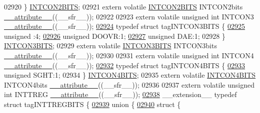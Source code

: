 \begin{DoxyCode}
02920 \} \hyperlink{a00008_d8/d57/a00498}{INTCON2BITS};
02921 \textcolor{keyword}{extern} \textcolor{keyword}{volatile} \hyperlink{a00008_d8/d57/a00498}{INTCON2BITS} INTCON2bits \hyperlink{a00009_a493c46f03454991ccc5aa7a6e1dfb2a7}{\_\_attribute\_\_}((\_\_sfr\_\_));
02922 
02923 \textcolor{keyword}{extern} \textcolor{keyword}{volatile} \textcolor{keywordtype}{unsigned} \textcolor{keywordtype}{int}  INTCON3 \hyperlink{a00009_a493c46f03454991ccc5aa7a6e1dfb2a7}{\_\_attribute\_\_}((\_\_sfr\_\_));
\hypertarget{a00009_source_l02924}{}\hyperlink{a00008}{02924} \textcolor{keyword}{typedef} \textcolor{keyword}{struct }tagINTCON3BITS \{
\hypertarget{a00009_source_l02925}{}\hyperlink{a00008_adf71f3d8410c1f1dbbc96680a92c49af}{02925}   \textcolor{keywordtype}{unsigned} :4;
\hypertarget{a00009_source_l02926}{}\hyperlink{a00008_ac08ea92557a6100bdfa6e0c8e1842273}{02926}   \textcolor{keywordtype}{unsigned} DOOVR:1;
\hypertarget{a00009_source_l02927}{}\hyperlink{a00008_aec1162551ca60d4d19c47e42894a1c1b}{02927}   \textcolor{keywordtype}{unsigned} DAE:1;
02928 \} \hyperlink{a00008_d8/d67/a00499}{INTCON3BITS};
02929 \textcolor{keyword}{extern} \textcolor{keyword}{volatile} \hyperlink{a00008_d8/d67/a00499}{INTCON3BITS} INTCON3bits \hyperlink{a00009_a493c46f03454991ccc5aa7a6e1dfb2a7}{\_\_attribute\_\_}((\_\_sfr\_\_));
02930 
02931 \textcolor{keyword}{extern} \textcolor{keyword}{volatile} \textcolor{keywordtype}{unsigned} \textcolor{keywordtype}{int}  INTCON4 \hyperlink{a00009_a493c46f03454991ccc5aa7a6e1dfb2a7}{\_\_attribute\_\_}((\_\_sfr\_\_));
\hypertarget{a00009_source_l02932}{}\hyperlink{a00008}{02932} \textcolor{keyword}{typedef} \textcolor{keyword}{struct }tagINTCON4BITS \{
\hypertarget{a00009_source_l02933}{}\hyperlink{a00008_af7d1f4e1cc3f0d22f2c69971173c3c0f}{02933}   \textcolor{keywordtype}{unsigned} SGHT:1;
02934 \} \hyperlink{a00008_de/d4e/a00500}{INTCON4BITS};
02935 \textcolor{keyword}{extern} \textcolor{keyword}{volatile} \hyperlink{a00008_de/d4e/a00500}{INTCON4BITS} INTCON4bits \hyperlink{a00009_a493c46f03454991ccc5aa7a6e1dfb2a7}{\_\_attribute\_\_}((\_\_sfr\_\_));
02936 
02937 \textcolor{keyword}{extern} \textcolor{keyword}{volatile} \textcolor{keywordtype}{unsigned} \textcolor{keywordtype}{int}  INTTREG \hyperlink{a00009_a493c46f03454991ccc5aa7a6e1dfb2a7}{\_\_attribute\_\_}((\_\_sfr\_\_));
\hypertarget{a00009_source_l02938}{}\hyperlink{a00008}{02938} \_\_extension\_\_ \textcolor{keyword}{typedef} \textcolor{keyword}{struct }tagINTTREGBITS \{
\hypertarget{a00009_source_l02939}{}\hyperlink{a00009}{02939}   \textcolor{keyword}{union }\{
\hypertarget{a00009_source_l02940}{}\hyperlink{a00009}{02940}     \textcolor{keyword}{struct }\{

\end{DoxyCode}
